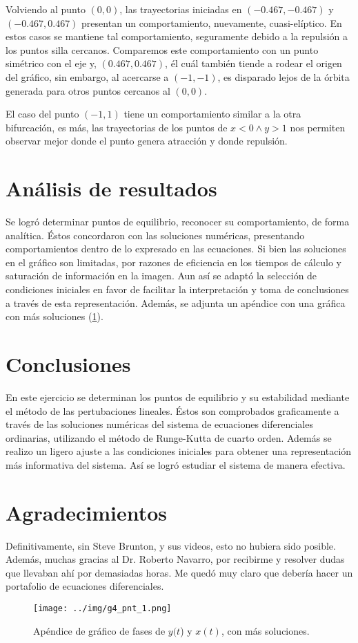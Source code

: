 \documentclass[../portafolio.tex]{subfiles}
\begin{document}
Volviendo al punto $(0,0)$, las trayectorias iniciadas en $(-0.467,-0.467)$ y $(-0.467,0.467)$ presentan un comportamiento, nuevamente, cuasi-elíptico. En estos casos se mantiene tal comportamiento, seguramente debido a la repulsión a los puntos silla cercanos. Comparemos este comportamiento con un punto simétrico con el eje y, $(0.467,0.467)$, él cuál también tiende a rodear el origen del gráfico, sin embargo, al acercarse a $(-1,-1)$, es disparado lejos de la órbita generada para otros puntos cercanos al $(0,0)$. 

El caso del punto $(-1,1)$ tiene un comportamiento similar a la otra bifurcación, es más, las trayectorias de los puntos de $x<0 \wedge y>1$ nos permiten observar mejor donde el punto genera atracción y donde repulsión. 

\section{Análisis de resultados}
Se logró determinar puntos de equilibrio, reconocer su comportamiento, de forma analítica. Éstos concordaron con las soluciones numéricas, presentando comportamientos dentro de lo expresado en las ecuaciones. Si bien las soluciones en el gráfico son limitadas, por razones de eficiencia en los tiempos de cálculo y saturación de información en la imagen. Aun así se adaptó la selección de condiciones iniciales en favor de facilitar la interpretación y toma de conclusiones a través de esta representación. Además, se adjunta un apéndice con una gráfica con más soluciones (\ref{g4_ej10:graf_1}).
\section*{Conclusiones}

En este ejercicio se determinan los puntos de equilibrio y su estabilidad mediante el método de las pertubaciones lineales. Éstos son comprobados graficamente a través de las soluciones numéricas del sistema de ecuaciones diferenciales ordinarias, utilizando el método de Runge-Kutta de cuarto orden. Además se realizo un ligero ajuste a las condiciones iniciales para obtener una representación más informativa del sistema. Así se logró estudiar el sistema de manera efectiva.
\section*{Agradecimientos}
Definitivamente, sin Steve Brunton, y sus videos, esto no hubiera sido posible. Además, muchas gracias al Dr. Roberto Navarro, por recibirme y resolver dudas que llevaban ahí por demasiadas horas. Me quedó muy claro que debería hacer un portafolio de ecuaciones diferenciales.

\begin{figure}
\centering
\texttt{[image: ../img/g4\_pnt\_1.png]}
\caption{Apéndice de gráfico de fases de $y(t$) y $x(t)$, con más soluciones.} \label{g4_ej10:graf_1}
\end{figure}
\end{document}
